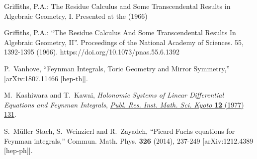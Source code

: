 \documentclass[a4paper,12pt]{article}
\numberwithin{equation}{section}
\numberwithin{figure}{section}
\begin{document}
\begin{thebibliography}{99}
   Griffiths, P.A.: The Residue Calculus and Some
    Transcendental Results in Algebraic Geometry, I. Presented at the
    (1966)

    Griffiths, P.A.: ``The Residue Calculus And Some Transcendental
    Results In Algebraic Geometry, II''. Proceedings of the National
    Academy of Sciences. 55, 1392-1395
    (1966). https://doi.org/10.1073/pnas.55.6.1392 
  
P.~Vanhove,
``Feynman Integrals, Toric Geometry and Mirror Symmetry,''
[arXiv:1807.11466 [hep-th]].


M.~Kashiwara and T.~Kawai, \emph{{Holonomic Systems of Linear Differential
		Equations and Feynman Integrals}},
\href{https://doi.org/10.2977/prims/1195196602}{\emph{Publ. Res. Inst. Math.
		Sci. Kyoto} {\bfseries 12} (1977) 131}.
	
	S.~M\"uller-Stach, S.~Weinzierl and R.~Zayadeh,
	``Picard-Fuchs equations for Feynman integrals,''
	Commun. Math. Phys. \textbf{326} (2014), 237-249
	[arXiv:1212.4389 [hep-ph]].
	
\end{thebibliography}
\end{document}
